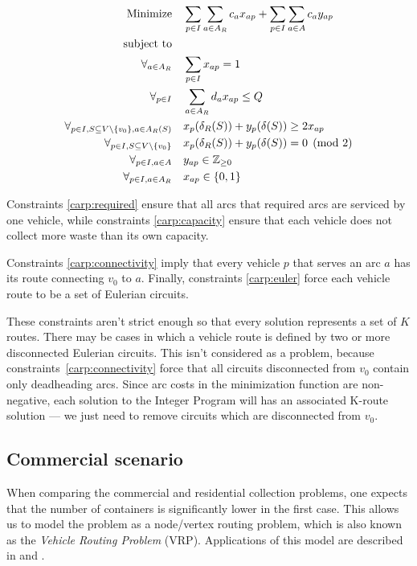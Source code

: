 \begin{align}
	\mbox{Minimize} & \quad \sum_{p \in I} \sum_{a \in A_R} c_a x_{ap} +
	\sum_{p \in I} \sum_{a \in A} c_{a} y_{ap}
	\\
	\mbox{subject to} &  \notag{} \\
	\forall_{a \in A_R} & \quad \sum_{p \in I} x_{ap} = 1
	\label{carp:required}
	\\
	\forall_{p \in I} & \quad \sum_{a \in A_R} d_a x_{ap} \leq Q
	\label{carp:capacity}
	\\
	\forall_{p \in I, S \subseteq V \setminus \{v_0\}, a \in A_R(S)} &
	\quad x_p(\delta_R(S)) + y_p(\delta(S)) \geq 2x_{ap}
	\label{carp:connectivity}
	\\
	\forall_{p \in I, S \subseteq V \setminus \{v_0\}} & \quad
	x_p(\delta_R(S)) + y_p(\delta(S)) = 0 \pmod{2}
	\label{carp:euler}
	\\
	\forall_{p \in I, a \in A} & \quad y_{ap} \in \mathbb{Z}_{\geq0} \\
	\forall_{p \in I, a \in A_R} & \quad x_{ap} \in \{0, 1\}
\end{align}

Constraints \eqref{carp:required} ensure that all arcs that required arcs are
serviced by one vehicle, while constraints \eqref{carp:capacity} ensure that each
vehicle does not collect more waste than its own capacity.

Constraints \eqref{carp:connectivity} imply that every vehicle $p$ that serves
an arc $a$ has its route connecting $v_0$ to $a$. Finally, constraints
\eqref{carp:euler} force each vehicle route to be a set of Eulerian circuits.

These constraints aren't strict enough so that every solution represents a set
of $K$ routes. There may be cases in which a vehicle route is defined by two or
more disconnected Eulerian circuits. This isn't considered as a problem,
because constraints~\eqref{carp:connectivity} force that all circuits
disconnected from $v_0$ contain only deadheading arcs. Since arc costs in the
minimization function are non-negative, each solution to the Integer Program
will has an associated K-route solution --- we just need to remove circuits
which are disconnected from $v_0$.




\subsection{Commercial scenario}

When comparing the commercial and residential collection problems, one expects
that the number of containers is significantly lower in the first case. This
allows us to model the problem as a node/vertex routing problem, which is also
known as the \textit{Vehicle Routing Problem} (VRP). Applications of this model
are described in \citet{Tung2000} and \citet{Kim06}.

